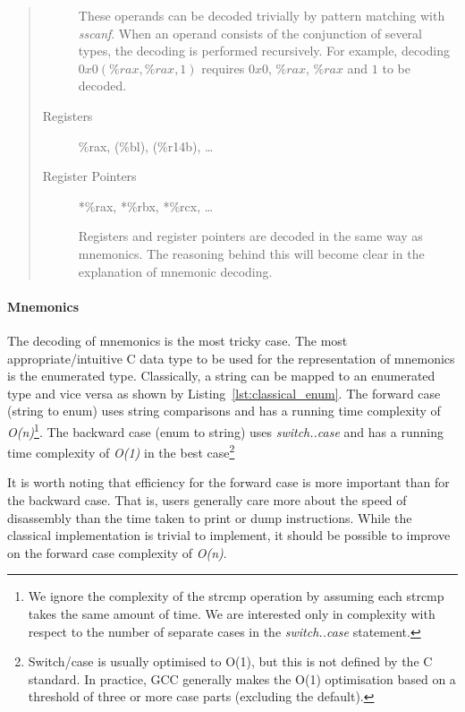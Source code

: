 \begin{minipage}{\textwidth}
\begin{quote}
\begin{description}
These operands can be decoded trivially by pattern matching with \emph{sscanf}. When an operand consists of the conjunction of several types, the decoding is performed recursively. For example, decoding $0x0(\%rax,\%rax,1)$ requires $0x0$, $\%rax$, $\%rax$ and $1$ to be decoded.

\item [Registers] \%rax, (\%bl), (\%r14b), \ldots
\item [Register Pointers] *\%rax, *\%rbx, *\%rcx, \ldots

Registers and register pointers are decoded in the same way as mnemonics. The reasoning behind this will become clear in the explanation of mnemonic decoding.
\end{description}
\end{quote}
\end{minipage}

\paragraph{Mnemonics}

The decoding of mnemonics is the most tricky case. The most appropriate/intuitive C data type to be used for the representation of mnemonics is the enumerated type. Classically, a string can be mapped to an enumerated type and vice versa as shown by Listing~\ref{lst:classical_enum}. The forward case (string to enum) uses string comparisons and has a running time complexity of \emph{O(n)}\footnote{We ignore the complexity of the strcmp operation by assuming each strcmp takes the same amount of time. We are interested only in complexity with respect to the number of separate cases in the \emph{switch..case} statement.}. The backward case (enum to string) uses \emph{switch..case} and has a running time complexity of \emph{O(1)} in the best case\footnote{Switch/case is usually optimised to O(1), but this is not defined by the C standard. In practice, GCC generally makes the O(1) optimisation based on a threshold of three or more case parts (excluding the default).} 

It is worth noting that efficiency for the forward case is more important than for the backward case. That is, users generally care more about the speed of disassembly than the time taken to print or dump instructions. While the classical implementation is trivial to implement, it should be possible to improve on the forward case complexity of \emph{O(n)}.

